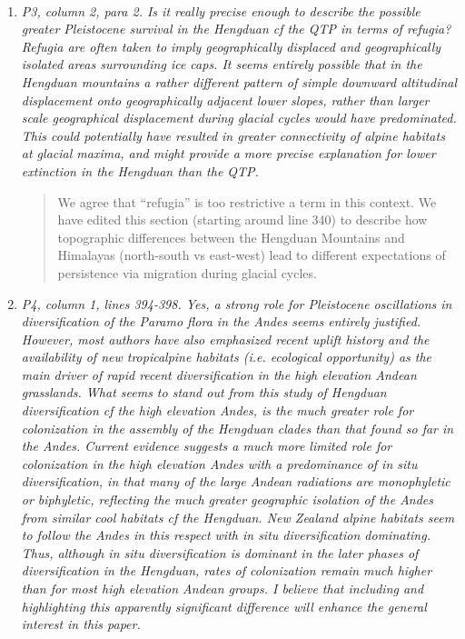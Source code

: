 \documentclass[11pt]{letter}
\begin{document}
\begin{letter}{ \\

}
\begin{enumerate}
\item \textit{P3, column 2, para 2. Is it really precise enough to
    describe the possible greater Pleistocene survival in the Hengduan
    cf the QTP in terms of refugia? Refugia are often taken to imply
    geographically displaced and geographically isolated areas
    surrounding ice caps. It seems entirely possible that in the
    Hengduan mountains a rather different pattern of simple downward
    altitudinal displacement onto geographically adjacent lower
    slopes, rather than larger scale geographical displacement during
    glacial cycles would have predominated. This could potentially
    have resulted in greater connectivity of alpine habitats at
    glacial maxima, and might provide a more precise explanation for
    lower extinction in the Hengduan than the QTP.}

  \begin{quote}
    We agree that ``refugia'' is too restrictive a term in this
    context. We have edited this section (starting around line 340) to
    describe how topographic differences between the Hengduan
    Mountains and Himalayas (north-south vs east-west) lead to
    different expectations of persistence via migration during glacial
    cycles.
  \end{quote}
  
\item \textit{P4, column 1, lines 394-398. Yes, a strong role for
    Pleistocene oscillations in diversification of the Paramo flora in
    the Andes seems entirely justified. However, most authors have
    also emphasized recent uplift history and the availability of new
    tropicalpine habitats (i.e. ecological opportunity) as the main
    driver of rapid recent diversification in the high elevation
    Andean grasslands. What seems to stand out from this study of
    Hengduan diversification cf the high elevation Andes, is the much
    greater role for colonization in the assembly of the Hengduan
    clades than that found so far in the Andes.  Current evidence
    suggests a much more limited role for colonization in the high
    elevation Andes with a predominance of in situ diversification, in
    that many of the large Andean radiations are monophyletic or
    biphyletic, reflecting the much greater geographic isolation of
    the Andes from similar cool habitats cf the Hengduan. New Zealand
    alpine habitats seem to follow the Andes in this respect with in
    situ diversification dominating.  Thus, although in situ
    diversification is dominant in the later phases of diversification
    in the Hengduan, rates of colonization remain much higher than for
    most high elevation Andean groups. I believe that including and
    highlighting this apparently significant difference will enhance
    the general interest in this paper.}


\end{enumerate}
\end{letter}
\end{document}
